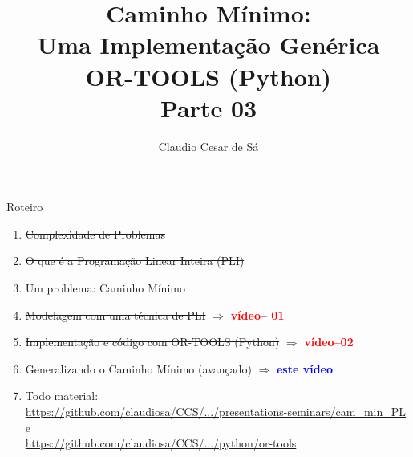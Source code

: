 \documentclass{beamer}
\title[Inteligência Artificial -- Otimização Combinatória] %
{Caminho Mínimo: \\  Uma Implementação Genérica \\ OR-TOOLS (Python)\\Parte 03}
\author[Claudio Cesar de Sá] %
{Claudio Cesar de Sá\inst{1}}
\institute[UDESC]{Pesquisador Independente}
\date[\today] %
\begin{document}
\begin{frame}
  \titlepage
\end{frame}








\begin{frame}

\begin{block}{Roteiro}

\begin{enumerate}

  \item  \sout{Complexidade de Problemas}
  \item  \sout{ O que é a Programação Linear Inteira (PLI)}
  \item   \sout{ Um problema:  Caminho Mínimo}
  \item   \sout{ Modelagem com uma técnica de PLI } $\Rightarrow$ \textbf{\textcolor{red}{vídeo-- 01}}
  \item \sout{ Implementação e código com OR-TOOLS (Python)} $\Rightarrow$  \textbf{\textcolor{red}{vídeo--02}} 
  \item  Generalizando o Caminho Mínimo (avançado) $\Rightarrow$ \textbf{\textcolor{blue}{este vídeo}} 
  \item Todo material:\\ {\small \url{https://github.com/claudiosa/CCS/.../presentations-seminars/cam_min_PL}}\\
  e\\
 {\small  \url{https://github.com/claudiosa/CCS/.../python/or-tools}}
  \end{enumerate}

\end{block}

\end{frame}
\end{document}

